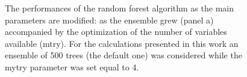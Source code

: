 \documentclass[
12pt, %
a4paper, %
oneside, %
headinclude,footinclude, %
BCOR5mm, %
]{scrartcl}
\begin{document}
\begin{figure}[h]
  \centering
{}
\caption{The performances of the random forest algorithm as the main parameters are modified: as the ensemble grew (panel a) accompanied by the optimization of the number of variables available (mtry). For the calculations presented in this work an ensemble of 500 trees (the default one) was considered while the mytry parameter was set equal to 4.}
\label{Random_forest_tree_perfs}
\end{figure}
\end{document}
